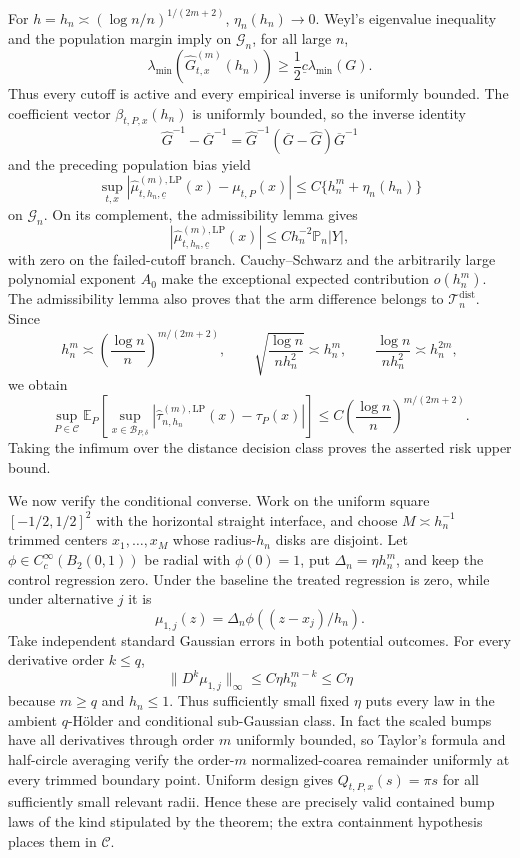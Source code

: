 For \(h=h_n\asymp(\log n/n)^{1/(2m+2)}\), \(\eta_n(h_n)\to0\).  Weyl's eigenvalue inequality and the population margin imply on \(\mathcal G_n\), for all large \(n\),
\[
 \lambda_{\min}(\widehat G^{(m)}_{t,x}(h_n))
 \geq\frac12\underline c\lambda_{\min}(G).
\]
Thus every cutoff is active and every empirical inverse is uniformly bounded.  The coefficient vector \(\beta_{t,P,x}(h_n)\) is uniformly bounded, so the inverse identity
\[
 \widehat G^{-1}-\overline G^{-1}
 =\widehat G^{-1}(\overline G-\widehat G)\overline G^{-1}
\]
and the preceding population bias yield
\[
 \sup_{t,x}
 |\widehat\mu^{(m),\mathrm{LP}}_{t,h_n,\underline c}(x)-\mu_{t,P}(x)|
 \leq C\{h_n^m+\eta_n(h_n)\}
\]
on \(\mathcal G_n\).  On its complement, the admissibility lemma gives
\[
 |\widehat\mu^{(m),\mathrm{LP}}_{t,h_n,\underline c}(x)|
 \leq Ch_n^{-2}\mathbb P_n|Y|,
\]
with zero on the failed-cutoff branch.  Cauchy--Schwarz and the arbitrarily large polynomial exponent \(A_0\) make the exceptional expected contribution \(o(h_n^m)\).  The admissibility lemma also proves that the arm difference belongs to \(\mathcal T_n^{\mathrm{dist}}\).  Since
\[
 h_n^m\asymp\left(\frac{\log n}{n}\right)^{m/(2m+2)},
 \qquad
 \sqrt{\frac{\log n}{nh_n^2}}\asymp h_n^m,
 \qquad
 \frac{\log n}{nh_n^2}\asymp h_n^{2m},
\]
we obtain
\[
 \sup_{P\in\mathcal C}\mathbb E_P\!\left[
 \sup_{x\in\mathcal B_{P,\delta}}
 |\widehat\tau^{(m),\mathrm{LP}}_{n,h_n}(x)-\tau_P(x)|
 \right]
 \leq C\left(\frac{\log n}{n}\right)^{m/(2m+2)}.
\]
Taking the infimum over the distance decision class proves the asserted risk upper bound.

We now verify the conditional converse.  Work on the uniform square \([-1/2,1/2]^2\) with the horizontal straight interface, and choose \(M\asymp h_n^{-1}\) trimmed centers \(x_1,\ldots,x_M\) whose radius-\(h_n\) disks are disjoint.  Let \(\phi\in C_c^\infty(B_2(0,1))\) be radial with \(\phi(0)=1\), put \(\Delta_n=\eta h_n^m\), and keep the control regression zero.  Under the baseline the treated regression is zero, while under alternative \(j\) it is
\[
 \mu_{1,j}(z)=\Delta_n\phi((z-x_j)/h_n).
\]
Take independent standard Gaussian errors in both potential outcomes.  For every derivative order \(k\leq q\),
\[
 \lVert D^k\mu_{1,j}\rVert_\infty
 \leq C\eta h_n^{m-k}\leq C\eta
\]
because \(m\geq q\) and \(h_n\leq1\).  Thus sufficiently small fixed \(\eta\) puts every law in the ambient \(q\)-H\"older and conditional sub-Gaussian class.  In fact the scaled bumps have all derivatives through order \(m\) uniformly bounded, so Taylor's formula and half-circle averaging verify the order-\(m\) normalized-coarea remainder uniformly at every trimmed boundary point.  Uniform design gives \(Q_{t,P,x}(s)=\pi s\) for all sufficiently small relevant radii.  Hence these are precisely valid contained bump laws of the kind stipulated by the theorem; the extra containment hypothesis places them in \(\mathcal C\).

